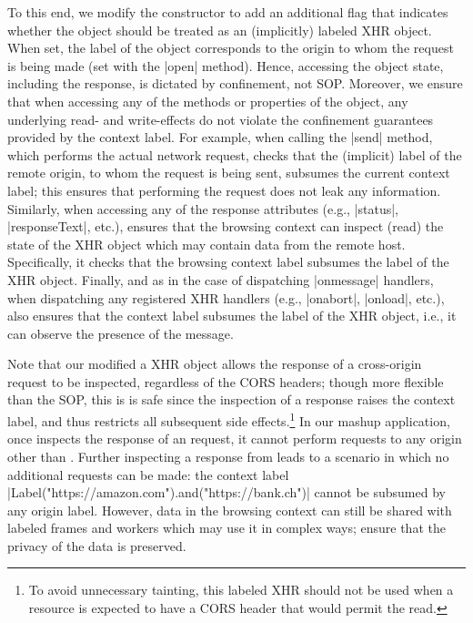 To this end, we modify the \xhr{} constructor to add an additional
flag that indicates whether the object should be treated as an
(implicitly) labeled XHR object.
%
When set, the  label of the object corresponds to the origin
to whom the request is being made (set with the \js|open| method). 
%
Hence, accessing the object state, including the response, is dictated by
confinement, not SOP.
%
Moreover, we ensure that when accessing any of the methods or
properties of the object, any underlying read- and write-effects do
not violate the confinement guarantees provided by the context label.
%
For example, when calling the \js|send| method, which performs the
actual network request, \sys{} checks that the (implicit) label of the
remote origin, to whom the request is being sent, subsumes the current
context label;
%
this ensures that performing the request does not leak any
information.
%
Similarly, when accessing any of the response attributes (e.g.,
\js|status|, \js|responseText|, etc.), \sys{} ensures that the
browsing context can inspect (read) the state of the XHR object which
may contain data from the remote host.
%
Specifically, it checks that the browsing context label subsumes the
label of the XHR object.
%
Finally, and as in the case of dispatching \js|onmessage| handlers,
when dispatching any registered XHR
handlers (e.g., \js|onabort|, \js|onload|, etc.), \sys{} also ensures
that the context label subsumes the label of the XHR object, i.e., it
can observe the presence of the message.
 
Note that our modified a XHR object allows the response of a
cross-origin request to be inspected, regardless of the CORS headers;
though more flexible than the SOP, this is is safe since the
inspection of a response raises the context label, and thus restricts
all subsequent side effects.\footnote{
  To avoid unnecessary tainting, this labeled XHR should not be used
  when a resource is expected to have a CORS header that would permit
  the read.
}
%
In our mashup application, once  inspects the
response of an  request, it cannot perform requests
to any origin other than .
%
Further inspecting a response from  leads to a scenario
in which no additional requests can be made: the context label  
\js|Label("https://amazon.com").and("https://bank.ch")|
cannot be subsumed by any origin label. 
%
However, data in the browsing context can still be shared with labeled
frames and workers which may use it in complex ways; \sys{} ensure
that the privacy of the data is preserved.
% 

